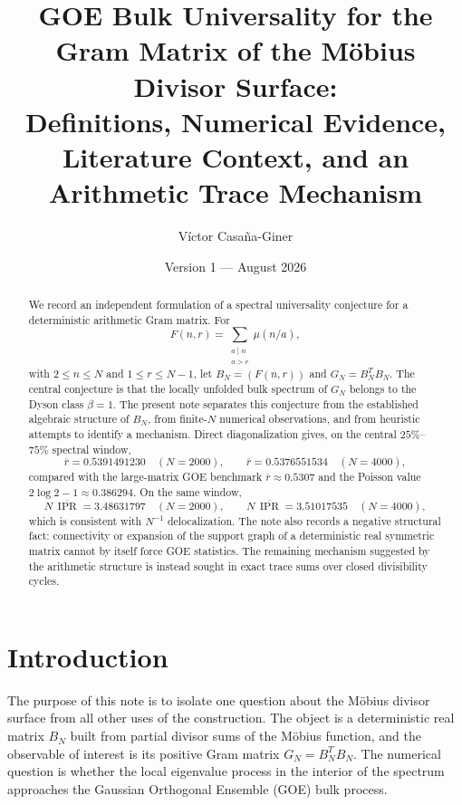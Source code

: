 \documentclass[11pt]{amsart}
\title{GOE Bulk Universality for the Gram Matrix of the M\"obius Divisor Surface:\\
Definitions, Numerical Evidence, Literature Context, and an Arithmetic Trace Mechanism}
\author{V\'ictor Casa\~na-Giner}
\date{Version 1 --- August 2026}
\numberwithin{equation}{section}
\theoremstyle{plain}
\theoremstyle{definition}
\theoremstyle{remark}
\newcommand{\mob}{\mu}
\newcommand{\IPR}{\operatorname{IPR}}
\begin{document}
\begin{abstract}
We record an independent formulation of a spectral universality conjecture for a deterministic arithmetic Gram matrix.  For
\begin{equation}
F(n,r)=\sum_{\substack{a\mid n\\ a>r}}\mob(n/a),
\label{eq:abstract_surface}
\end{equation}
with $2\le n\le N$ and $1\le r\le N-1$, let $B_N=(F(n,r))$ and $G_N=B_N^TB_N$.  The central conjecture is that the locally unfolded bulk spectrum of $G_N$ belongs to the Dyson class $\beta=1$.  The present note separates this conjecture from the established algebraic structure of $B_N$, from finite-$N$ numerical observations, and from heuristic attempts to identify a mechanism.  Direct diagonalization gives, on the central $25\%$--$75\%$ spectral window,
\begin{equation}
\overline r=0.5391491230\quad(N=2000),
\qquad
\overline r=0.5376551534\quad(N=4000),
\label{eq:abstract_gap_ratios}
\end{equation}
compared with the large-matrix GOE benchmark $\overline r\approx0.5307$ and the Poisson value $2\log 2-1\approx0.386294$.  On the same window,
\begin{equation}
N\,\overline{\IPR}=3.48631797\quad(N=2000),
\qquad
N\,\overline{\IPR}=3.51017535\quad(N=4000),
\label{eq:abstract_ipr}
\end{equation}
which is consistent with $N^{-1}$ delocalization.  The note also records a negative structural fact: connectivity or expansion of the support graph of a deterministic real symmetric matrix cannot by itself force GOE statistics.  The remaining mechanism suggested by the arithmetic structure is instead sought in exact trace sums over closed divisibility cycles.
\end{abstract}

\maketitle
\tableofcontents
\bigskip

\section{Introduction}
\label{sec:introduction}

The purpose of this note is to isolate one question about the M\"obius divisor surface from all other uses of the construction.  The object is a deterministic real matrix $B_N$ built from partial divisor sums of the M\"obius function, and the observable of interest is its positive Gram matrix $G_N=B_N^TB_N$.  The numerical question is whether the local eigenvalue process in the interior of the spectrum approaches the Gaussian Orthogonal Ensemble (GOE) bulk process.
\end{document}
